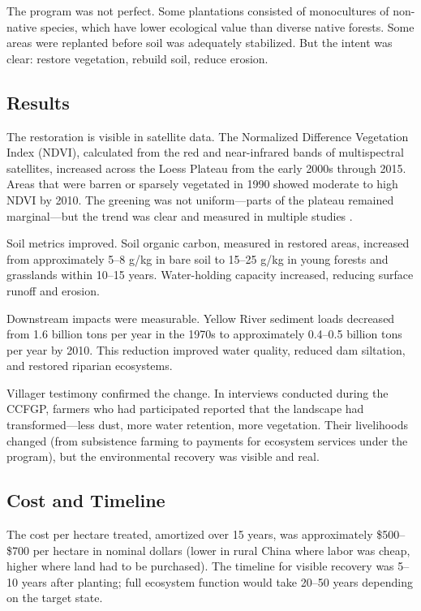 \documentclass[12pt,a4paper]{article}
\begin{document}
The program was not perfect. Some plantations consisted of monocultures of non-native species, which have lower ecological value than diverse native forests. Some areas were replanted before soil was adequately stabilized. But the intent was clear: restore vegetation, rebuild soil, reduce erosion.

\subsection{Results}

The restoration is visible in satellite data. The Normalized Difference Vegetation Index (NDVI), calculated from the red and near-infrared bands of multispectral satellites, increased across the Loess Plateau from the early 2000s through 2015. Areas that were barren or sparsely vegetated in 1990 showed moderate to high NDVI by 2010. The greening was not uniform—parts of the plateau remained marginal—but the trend was clear and measured in multiple studies \citep{Feng:2016}.

Soil metrics improved. Soil organic carbon, measured in restored areas, increased from approximately 5–8 g/kg in bare soil to 15–25 g/kg in young forests and grasslands within 10–15 years. Water-holding capacity increased, reducing surface runoff and erosion.

Downstream impacts were measurable. Yellow River sediment loads decreased from 1.6 billion tons per year in the 1970s to approximately 0.4–0.5 billion tons per year by 2010. This reduction improved water quality, reduced dam siltation, and restored riparian ecosystems.

Villager testimony confirmed the change. In interviews conducted during the CCFGP, farmers who had participated reported that the landscape had transformed—less dust, more water retention, more vegetation. Their livelihoods changed (from subsistence farming to payments for ecosystem services under the program), but the environmental recovery was visible and real.

\subsection{Cost and Timeline}

The cost per hectare treated, amortized over 15 years, was approximately \$500–\$700 per hectare in nominal dollars (lower in rural China where labor was cheap, higher where land had to be purchased). The timeline for visible recovery was 5–10 years after planting; full ecosystem function would take 20–50 years depending on the target state.
\end{document}

